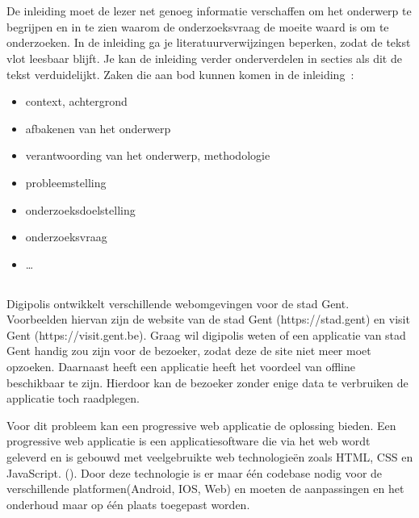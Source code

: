 
\chapter{}
\label{ch:inleiding}

De inleiding moet de lezer net genoeg informatie verschaffen om het onderwerp te begrijpen en in te zien waarom de onderzoeksvraag de moeite waard is om te onderzoeken. In de inleiding ga je literatuurverwijzingen beperken, zodat de tekst vlot leesbaar blijft. Je kan de inleiding verder onderverdelen in secties als dit de tekst verduidelijkt. Zaken die aan bod kunnen komen in de inleiding~\autocite{Pollefliet2011}:

\begin{itemize}
  \item context, achtergrond
  \item afbakenen van het onderwerp
  \item verantwoording van het onderwerp, methodologie
  \item probleemstelling
  \item onderzoeksdoelstelling
  \item onderzoeksvraag
  \item \ldots
\end{itemize}

\section{}
\label{sec:probleemstelling}

Digipolis ontwikkelt verschillende webomgevingen voor de stad Gent. Voorbeelden hiervan zijn de website van de stad Gent (https://stad.gent) en visit Gent (https://visit.gent.be). Graag wil digipolis weten of een applicatie van stad Gent handig zou zijn voor de bezoeker, zodat deze de site niet meer moet opzoeken. Daarnaast heeft een applicatie heeft het voordeel van offline beschikbaar te zijn. Hierdoor kan de bezoeker zonder enige data te verbruiken de applicatie toch raadplegen.

Voor dit probleem kan een progressive web applicatie de oplossing bieden. Een progressive web applicatie is een applicatiesoftware die via het web wordt geleverd en is gebouwd met veelgebruikte web technologieën zoals HTML, CSS en JavaScript. (\cite{DEFINITION_PWA}). Door deze technologie is er maar één codebase nodig voor de verschillende platformen(Android, IOS, Web) en moeten de aanpassingen en het onderhoud maar op één plaats toegepast worden.

